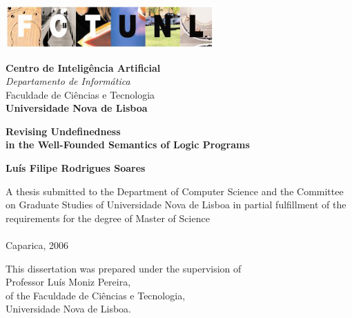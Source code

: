 \thispagestyle{empty}



  
\begin{minipage}{9cm}
	\vspace{2.5cm}
  \includegraphics[width=8cm]{fctunlnlogo.jpg}
\end{minipage}


\vspace{0.75cm}
  
\begin{minipage}{7cm}
	\small
	\textbf{Centro de Inteligência Artificial}\\
	\textsl{Departamento de Informática} \\
  Faculdade de Ciências e Tecnologia \\
  \textbf{Universidade Nova de Lisboa}
\end{minipage}



\vspace{7cm}

\begin{minipage}{17cm}
  \LARGE
  \bfseries 
  \Huge Revising Undefinedness\LARGE \\in the Well-Founded Semantics of Logic Programs
\end{minipage}

\vspace{1cm}

{\large\bfseries Luís Filipe Rodrigues Soares}




\vfill


\begin{minipage}{10cm}
\footnotesize A thesis submitted to the Department of Computer Science and the Committee on Graduate Studies of Universidade Nova de Lisboa in partial fulfillment of the requirements for the degree of Master of Science\\
\\
Caparica, 2006
\end{minipage}



\clearpage


\vfill
\begin{flushright}
  This dissertation was prepared under the supervision of\\
  Professor Luís Moniz Pereira,\\
  of the Faculdade de Ciências e Tecnologia,\\
  Universidade Nova de Lisboa.\\[0.5cm]
\end{flushright}

